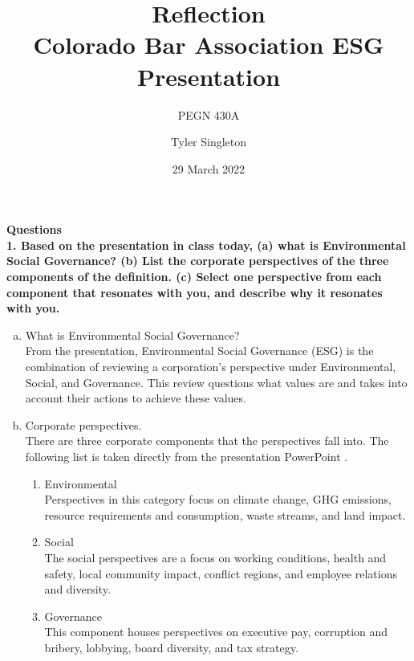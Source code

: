 \documentclass[12pt]{article}
\title{Reflection\\
Colorado Bar Association ESG Presentation}
\subtitle{PEGN 430A}
\author{Tyler Singleton}
\date{29 March 2022}
\begin{document}
\maketitle

\newpage
\setlength{\parindent}{0pt}

\textbf{Questions} \\

\textbf{1. Based on the presentation in class today, (a) what is Environmental Social Governance?  (b) List the corporate perspectives of the three components of the definition. (c) Select one perspective from each component that resonates with you, and describe why it resonates with you.} 

\begin{enumerate}[(a)]
    \item What is Environmental Social Governance? \\
    From the presentation, Environmental Social Governance (ESG) is the combination of reviewing a corporation's perspective under Environmental, Social, and Governance. This review questions what values are and takes into account their actions to achieve these values.
    
    \item Corporate perspectives. \\
    There are three corporate components that the perspectives fall into. The following list is taken directly from the presentation PowerPoint \cite{ESG_Reflection}.
    
        \begin{enumerate}[(1)]
            \item Environmental \\
                Perspectives in this category focus on climate change, GHG emissions, resource requirements and consumption, waste streams, and land impact.
            
            \item Social \\
                The social perspectives are a focus on working conditions, health and safety, local community impact, conflict regions, and employee relations and diversity.
            
            \item Governance \\
                This component houses perspectives on executive pay, corruption and bribery, lobbying, board diversity, and tax strategy.
            

\end{enumerate}
\end{enumerate}
\end{document}
